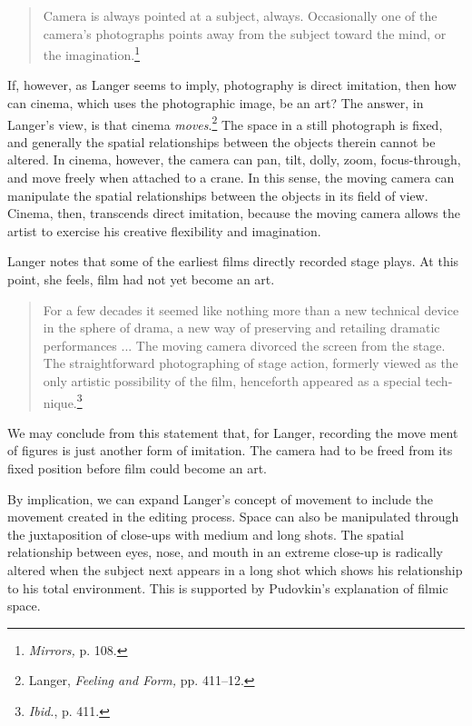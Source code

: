 \documentclass{tufte-handout}
\begin{document}
\begin{quote}
Camera is always pointed at a subject, always. Occasionally one of the
camera's photographs points away from the subject toward the mind, or
the imagination.\footnote{\emph{Mirrors,} p. 108.}
\end{quote}

\noindent If, however, as Langer seems to imply, photography is direct imitation,
then how can cinema, which uses the photographic image, be an art? The
answer, in Langer's view, is that cinema \emph{moves}.\footnote{Langer,
  \emph{Feeling and Form,} pp. 411--12.} The space in a still pho­tograph
is fixed, and generally the spatial relationships between the ob­jects
therein cannot be altered. In cinema, however, the camera can pan, tilt,
dolly, zoom, focus-through, and move freely when attached to a crane. In
this sense, the moving camera can manipulate the spatial relationships
between the objects in its field of view. Cinema, then, transcends
direct imitation, because the moving camera allows the artist to
exercise his crea­tive flexibility and imagination.

Langer notes that some of the earliest films directly recorded stage
plays. At this point, she feels, film had not yet become an art.

\begin{quote}
For a few decades it seemed like nothing more than a new technical
device in the sphere of drama, a new way of preserving and retailing
dramatic performances ... The moving camera divorced the screen from the
stage. The straightforward photographing of stage action, formerly
viewed as the only artistic possibility of the film, henceforth appeared
as a special tech­nique.\footnote{\emph{Ibid.}, p. 411.}
\end{quote}

\noindent We may conclude from this statement that, for Langer, recording the move­
ment of figures is just another form of imitation. The camera had to be
freed from its fixed position before film could become an art.

By implication, we can expand Langer's concept of movement to include
the movement created in the editing process. Space can also be
manipulated through the juxtaposition of close-ups with medium and long
shots. The spatial relationship between eyes, nose, and mouth in an
extreme close-up is radically altered when the subject next appears in a
long shot which shows his relationship to his total environment. This is
supported by Pudov­kin's explanation of filmic space.
\end{document}
